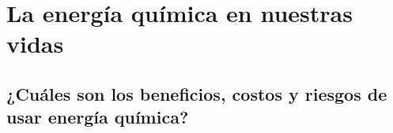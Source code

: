 \newpage \thispagestyle{plain}
\section{La energía química en nuestras vidas}
\subsection{¿Cuáles son los beneficios, costos y riesgos de usar energía química?}
